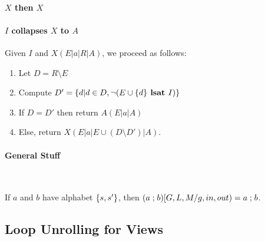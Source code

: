 
\paragraph{$X$ then $X$}


\paragraph{$I$ collapses $X$ to $A$}
Given $I$ and $X(E|a|R|A)$, we proceed as follows:
\begin{enumerate}
  \item Let $D = R \setminus E$
  \item Compute
    $D' =
       \{{  d | d \in D,
                    \lnot (E\cup\{{d}\} \textbf{ lsat } I)}\}
    $
  \item
    If $D = D'$ then return $A(E|a|A)$
  \item
    Else, return $X(E|a|E\cup(D \setminus D')|A)$.
\end{enumerate}

\paragraph{General Stuff}~

If $a$ and $b$ have alphabet $\{{s,s'}\}$,
then
$(a \mathrel{;} b)[G,L,M/g,in,out) = a\mathrel{;} b$.

\subsection{Loop Unrolling for Views}\label{hb:WWW-unroll}

